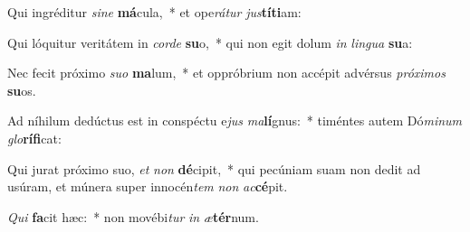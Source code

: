\item Qui ingréditur \textit{si}\textit{ne} \textbf{má}cula,~* et ope\textit{rá}\textit{tur} \textit{jus}\textbf{tí}\textbf{ti}am:
\item Qui lóquitur veritátem in \textit{cor}\textit{de} \textbf{su}o,~* qui non egit dolum \textit{in} \textit{lin}\textit{gua} \textbf{su}a:
\item Nec fecit próximo \textit{su}\textit{o} \textbf{ma}lum,~* et oppróbrium non accépit advérsus \textit{pró}\textit{xi}\textit{mos} \textbf{su}os.
\item Ad níhilum dedúctus est in conspéctu e\textit{jus} \textit{ma}\textbf{lí}gnus:~* timéntes autem Dó\textit{mi}\textit{num} \textit{glo}\textbf{rí}\textbf{fi}cat:
\item Qui jurat próximo suo, \textit{et} \textit{non} \textbf{dé}cipit,~* qui pecúniam suam non dedit ad usúram, et múnera super innocén\textit{tem} \textit{non} \textit{ac}\textbf{cé}pit.
\item \textit{Qui} \textbf{fa}cit hæc:~* non movébi\textit{tur} \textit{in} \textit{æ}\textbf{tér}num.
